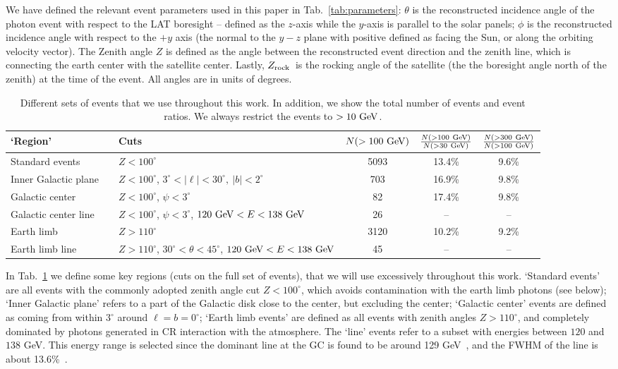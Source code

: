 \documentclass[aps,twocolumn,prd,superscriptaddress,showpacs,nofootinbib,fixfloat]{revtex4}
\newcommand{\GeV}{{\rm ~GeV}}
\newcommand{\zrock}{$Z_{\rm rock}$}
\begin{document}
We have defined the relevant event parameters used in this paper in
Tab.~\ref{tab:parameters}: $\theta$ is the reconstructed
incidence angle of the photon event with respect to the LAT
boresight -- defined as the $z$-axis while the $y$-axis is
parallel to the solar panels; $\phi$ is the reconstructed
incidence angle with respect to the $+y$ axis (the normal to
the $y-z$ plane with positive defined as facing the Sun, or
along the orbiting velocity vector). The Zenith angle $Z$ is
defined as the angle between the reconstructed event
direction and the zenith line, which is connecting the
earth center with the satellite center. 
Lastly, \zrock\ is the rocking angle of the satellite (the
the boresight angle north of the zenith) at the time of the event.
All angles are in units of degrees. 

\begin{table}
  \begin{tabular}{lllccc}
    \hline
    `Region' &&Cuts & $N(>100\GeV)$ & $\frac{N(>100\GeV)}{N(>30\GeV)}$ & $\frac{N(>300\GeV)}{N(>100\GeV)}$\\
    \hline
    Standard events      &  & $Z<100^\circ$ & 5093 & 13.4\% & 9.6\% \\
    Inner Galactic plane &  & $Z<100^\circ$, $3^\circ < |\ell| < 30^\circ,\ |b|<2^\circ$     & 703 & 16.9\% & 9.8\% \\
    Galactic center      &  & $Z<100^\circ$, $\psi<3^\circ$ & 82 & 17.4\% & 9.8\% \\
    Galactic center line &  & $Z<100^\circ$, $\psi<3^\circ$, $120\GeV<E<138\GeV$             & 26 & -- & -- \\
    Earth limb           &  & $Z>110^\circ$ & 3120 & 10.2\% & 9.2\% \\
    Earth limb line      &  & $Z>110^\circ$, $30^\circ<\theta<45^\circ$, $120\GeV<E<138\GeV$ & 45 & -- & -- \\ 
    \hline
  \end{tabular}
  \caption{Different sets of events that we use throughout this work. In
  addition, we show the total number of events and event ratios.
  We always restrict the events to $>10\GeV$.}
  \label{tab:regions}
\end{table}

In Tab.~\ref{tab:regions} we define some key regions (cuts on the full set of
events), that we will use excessively throughout this work. `Standard events'
are all events with the commonly adopted zenith angle cut $Z<100^\circ$, which
avoids contamination with the earth limb photons (see below); `Inner Galactic
plane' refers to a part of the Galactic disk close to the center, but
excluding the center; `Galactic center' events are defined as coming from
within $3^\circ$ around $\ell=b=0^\circ$; `Earth limb events' are defined as
all events with zenith angles $Z>110^\circ$, and completely dominated by
photons generated in CR interaction with the atmosphere. The `line' events
refer to a subset with energies between $120$ and $138$ GeV. This energy range
is selected since the dominant line at the GC is found to be around 129
GeV~\cite{linepaper}, and the FWHM of the line is about
13.6\%~\cite{Weniger:2012}.
\end{document}
